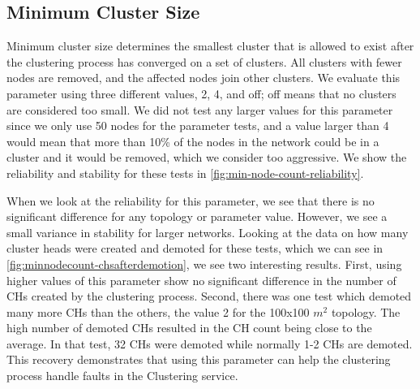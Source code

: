  
\subsection{Minimum Cluster Size}
Minimum cluster size determines the smallest cluster that is allowed to exist after the clustering process has converged on a set of clusters. All clusters with fewer nodes are removed, and the affected nodes join other clusters. We evaluate this parameter using three different values, 2, 4, and off; off means that no clusters are considered too small. We did not test any larger values for this parameter since we only use 50 nodes for the parameter tests, and a value larger than 4 would mean that more than 10\% of the nodes in the network could be in a cluster and it would be removed, which we consider too aggressive. We show the reliability and stability for these tests in \cref{fig:min-node-count-reliability}.

\begin{newtext}
When we look at the reliability for this parameter, we see that there is no significant difference for any topology or parameter value. However, we see a small variance in stability for larger networks. Looking at the data on how many cluster heads were created and demoted for these tests, which we can see in \cref{fig:minnodecount-chsafterdemotion}, we see two interesting results. First, using higher values of this parameter show no significant difference in the number of CHs created by the clustering process. Second, there was one test which demoted many more CHs than the others, the value 2 for the 100x100 $m^2$ topology. The high number of demoted CHs resulted in the CH count being close to the average. In that test, 32 CHs were demoted while normally 1-2 CHs are demoted. This recovery demonstrates that using this parameter can help the clustering process handle faults in the Clustering service. 
\end{newtext}




